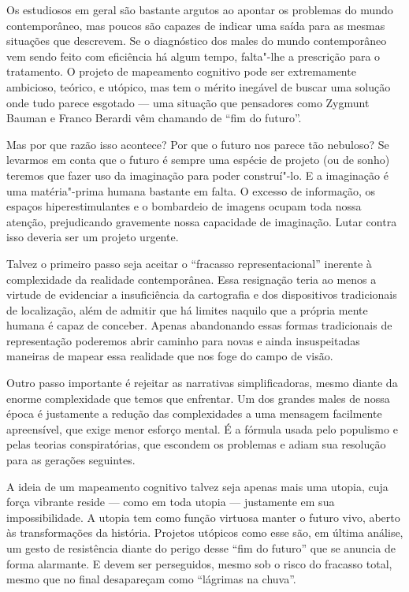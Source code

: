 Os estudiosos em geral são bastante argutos ao apontar os problemas do
mundo contemporâneo, mas poucos são capazes de indicar uma saída para as
mesmas situações que descrevem. Se o diagnóstico dos males do mundo
contemporâneo vem sendo feito com eficiência há algum tempo, falta"-lhe a
prescrição para o tratamento. O projeto de mapeamento cognitivo pode ser
extremamente ambicioso, teórico, e utópico, mas tem o mérito inegável de
buscar uma solução onde tudo parece esgotado --- uma situação que
pensadores como Zygmunt Bauman e Franco Berardi vêm chamando de ``fim do
futuro''.

Mas por que razão isso acontece? Por que o futuro nos parece tão
nebuloso? Se levarmos em conta que o futuro é sempre uma espécie de
projeto (ou de sonho) teremos que fazer uso da imaginação para poder
construí"-lo. E a imaginação é uma matéria"-prima humana bastante em
falta. O excesso de informação, os espaços hiperestimulantes e o
bombardeio de imagens ocupam toda nossa atenção, prejudicando gravemente
nossa capacidade de imaginação. Lutar contra isso deveria ser um projeto
urgente.

Talvez o primeiro passo seja aceitar o ``fracasso representacional''
inerente à complexidade da realidade contemporânea. Essa resignação
teria ao menos a virtude de evidenciar a insuficiência da cartografia e
dos dispositivos tradicionais de localização, além de admitir que há limites naquilo que a própria mente humana é capaz de conceber. Apenas abandonando essas formas tradicionais de
representação poderemos abrir caminho para novas e ainda insuspeitadas
maneiras de mapear essa realidade que nos foge do campo de visão.

Outro passo importante é rejeitar as narrativas simplificadoras, mesmo diante da enorme complexidade que temos que enfrentar. Um dos grandes males de nossa época é justamente a redução das complexidades a uma mensagem facilmente apreensível, que exige menor esforço mental. É a fórmula usada pelo populismo e pelas teorias conspiratórias, que escondem os problemas e adiam sua resolução para as gerações seguintes. 

A ideia de um mapeamento cognitivo talvez seja apenas mais uma utopia,
cuja força vibrante reside --- como em toda utopia --- justamente em sua
impossibilidade. A utopia tem como função virtuosa manter o futuro vivo,
aberto às transformações da história. Projetos utópicos como esse
são, em última análise, um gesto de resistência
diante do perigo desse ``fim do futuro'' que se anuncia de forma
alarmante. E devem ser perseguidos, mesmo sob o risco
do fracasso total, mesmo que no final desapareçam como ``lágrimas na
chuva''.


